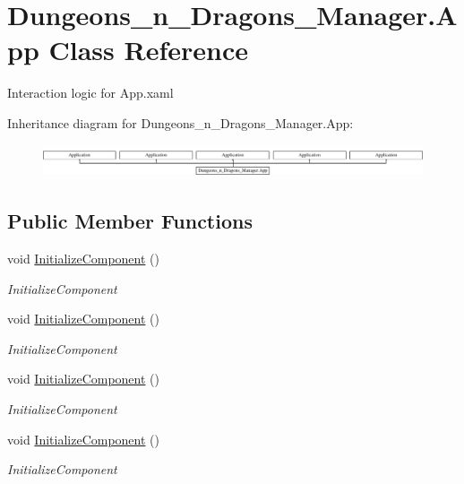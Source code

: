 \hypertarget{class_dungeons__n___dragons___manager_1_1_app}{}\section{Dungeons\+\_\+n\+\_\+\+Dragons\+\_\+\+Manager.\+App Class Reference}
\label{class_dungeons__n___dragons___manager_1_1_app}


Interaction logic for App.\+xaml  


Inheritance diagram for Dungeons\+\_\+n\+\_\+\+Dragons\+\_\+\+Manager.\+App\+:\begin{figure}[H]
\begin{center}
\leavevmode
\includegraphics[height=0.969697cm]{class_dungeons__n___dragons___manager_1_1_app}
\end{center}
\end{figure}
\subsection*{Public Member Functions}
\begin{DoxyCompactItemize}
\item 
void \mbox{\hyperlink{class_dungeons__n___dragons___manager_1_1_app_a173d3374932a9c43e07942879914cd00}{Initialize\+Component}} ()
\begin{DoxyCompactList}\small\item\em Initialize\+Component \end{DoxyCompactList}\item 
void \mbox{\hyperlink{class_dungeons__n___dragons___manager_1_1_app_a173d3374932a9c43e07942879914cd00}{Initialize\+Component}} ()
\begin{DoxyCompactList}\small\item\em Initialize\+Component \end{DoxyCompactList}\item 
void \mbox{\hyperlink{class_dungeons__n___dragons___manager_1_1_app_a173d3374932a9c43e07942879914cd00}{Initialize\+Component}} ()
\begin{DoxyCompactList}\small\item\em Initialize\+Component \end{DoxyCompactList}\item 
void \mbox{\hyperlink{class_dungeons__n___dragons___manager_1_1_app_a173d3374932a9c43e07942879914cd00}{Initialize\+Component}} ()
\begin{DoxyCompactList}\small\item\em Initialize\+Component \end{DoxyCompactList}\end{DoxyCompactItemize}
